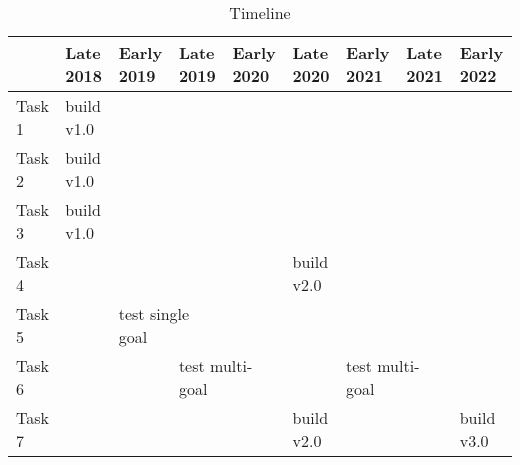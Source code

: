 \begin{table}
\caption{Timeline}
\label{tab:timeline}
\begin{center}
\small
\setlength\tabcolsep{5pt}
\begin{tabular}{ |l|l|l|l|l|l|l|l|l|}
  \hline
   & Late 2018 & Early 2019 & Late 2019 & Early 2020 & Late 2020 & Early 2021 & Late 2021 & Early 2022\\
   \hline
   Task 1 & \cellcolor{black!20}build v1.0 &&&&&&&\\
   \hline
   Task 2 & \cellcolor{black!20}build v1.0 &&&&&&&\\
   \hline
   Task 3 & \cellcolor{black!20}build v1.0 &&&&&&&\\
   \hline
   Task 4 &  & & & & \cellcolor{black!20} build v2.0 &&&\\
   \hline
   Task 5 &  & \multicolumn{2}{l|}{\cellcolor{black!20}test single goal} &&&&&\\
   \hline
   Task 6 &  & & \multicolumn{2}{l|}{\cellcolor{black!20}test multi-goal}&& \multicolumn{2}{l|}{\cellcolor{black!20}test multi-goal} & \\
   \hline
   Task 7 &  & & & & \cellcolor{black!20} build v2.0 &&&\cellcolor{black!20} build v3.0\\
   \hline
\end{tabular}
\end{center}
\end{table}